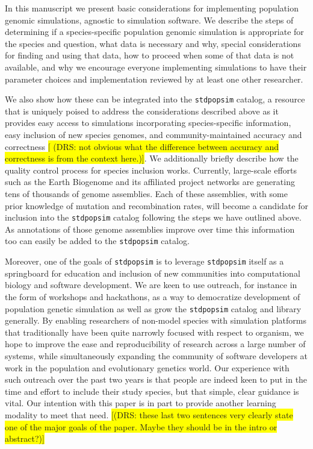 \documentclass[hidelinks]{article}
\newcommand{\stdpopsim}{\texttt{stdpopsim}\xspace}
\begin{document}
In this manuscript we present basic considerations for implementing
population genomic simulations, agnostic to simulation software. We
describe the steps of determining if a species-specific population
genomic simulation is appropriate for the species and question, what
data is necessary and why, special considerations for finding and using
that data, how to proceed when some of that data is not available,
and why we encourage everyone implementing simulations to have their
parameter choices and implementation reviewed by at least one other
researcher.

We also show how these can be integrated into the \stdpopsim catalog, a
resource that is uniquely poised to address the considerations described above as it provides easy
access to simulations incorporating species-specific information,
easy inclusion of new species genomes, and community-maintained accuracy
and correctness \colorbox{yellow}{[ (DRS: not obvious what the difference between accuracy
and correctness is from the context here.)]}.
We additionally briefly describe how the quality control
process for species inclusion works. Currently, large-scale efforts such as the Earth Biogenome
and its affiliated project networks are generating tens of thousands of genome
assemblies. Each of these assemblies, with some prior knowledge of mutation and
recombination rates, will become a candidate for inclusion into the
\stdpopsim catalog following the steps we have outlined above. As
annotations of those genome assemblies improve over time this information too can easily
be added to the \stdpopsim catalog.

Moreover, one of the goals of \stdpopsim is to leverage \stdpopsim itself
as a springboard for education and inclusion of new communities into
computational biology and software development. We are keen to use
outreach, for instance in the form of workshops and hackathons, as a way
to democratize development of population genetic simulation as well as
grow the \stdpopsim catalog and library generally. By enabling
researchers of non-model species with simulation platforms that
traditionally have been quite narrowly focused with respect to organism,
we hope to improve the ease and reproducibility of research across a large number of
systems, while simultaneously expanding the community of software
developers at work in the population and evolutionary genetics world.
Our experience with such outreach over the past two years is that people
are indeed keen to put in the time and effort to include their
study species, but that simple, clear guidance is vital. Our
intention with this paper is in part to provide another learning
modality to meet that need. \colorbox{yellow}{[(DRS: these last two sentences very
clearly state one of the major goals of the paper. Maybe they should be
in the intro or abstract?)]}
\end{document}
